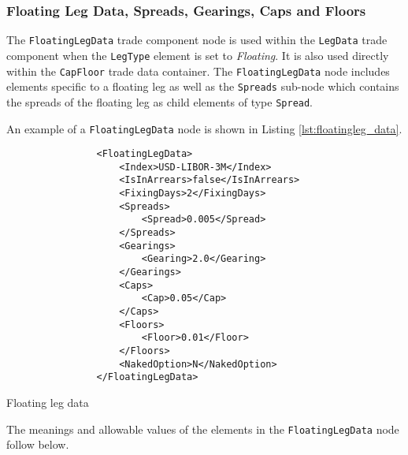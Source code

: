 \subsubsection{Floating Leg Data, Spreads, Gearings, Caps and Floors}
\label{ss:floatingleg_data}

The \lstinline!FloatingLegData! trade component node is used within the \lstinline!LegData! trade component when the
\lstinline!LegType! element is set to \emph{Floating}. It is also used directly within the \lstinline!CapFloor! trade
data container.  The \lstinline!FloatingLegData! node includes elements specific to a floating leg as well as the
\lstinline!Spreads! sub-node which contains the spreads of the floating leg as child elements of type
\lstinline!Spread!.

An example of a \lstinline!FloatingLegData! node is shown in Listing \ref{lst:floatingleg_data}.
\begin{listing}[H]
\begin{verbatim}
                <FloatingLegData>
                    <Index>USD-LIBOR-3M</Index>
                    <IsInArrears>false</IsInArrears>
                    <FixingDays>2</FixingDays>
                    <Spreads>
                        <Spread>0.005</Spread>
                    </Spreads>
                    <Gearings>
                        <Gearing>2.0</Gearing>
                    </Gearings>
                    <Caps>
                        <Cap>0.05</Cap>
                    </Caps>
                    <Floors>
                        <Floor>0.01</Floor>
                    </Floors>
                    <NakedOption>N</NakedOption>    
                </FloatingLegData>
\end{verbatim}
\caption{Floating leg data}
\label{lst:floatingleg_data}
\end{listing}

The meanings and allowable values of the elements in the \lstinline!FloatingLegData! node follow below.

